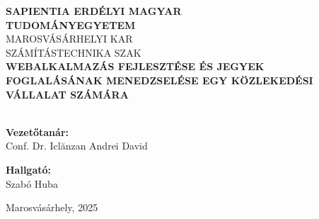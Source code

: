 \begin{titlepage}
    \centering
    \vspace*{2cm}

    {\Large \textbf{SAPIENTIA ERDÉLYI MAGYAR}}\\[0.2cm]
    {\Large \textbf{TUDOMÁNYEGYETEM}}\\[0.5cm]
    {\large MAROSVÁSÁRHELYI KAR}\\[0.2cm]
    {\large SZÁMÍTÁSTECHNIKA SZAK}\\[3cm]

    {\LARGE \textbf{WEBALKALMAZÁS FEJLESZTÉSE ÉS JEGYEK FOGLALÁSÁNAK MENEDZSELÉSE EGY KÖZLEKEDÉSI VÁLLALAT SZÁMÁRA}}\\[0.5cm] 
    {\Large \textbf{}}\\[4cm]

    \noindent
    \begin{minipage}[t]{0.48\textwidth}
        \raggedright
        \textbf{Vezetőtanár:}\\[1em]
        Conf. Dr. Iclănzan Andrei David
    \end{minipage}
    \hfill
    \begin{minipage}[t]{0.48\textwidth}
        \raggedleft
        \textbf{Hallgató:}\\[1em]
        Szabó Huba
    \end{minipage}


    \vfill

    {\large Marosvásárhely, 2025}

\end{titlepage}
